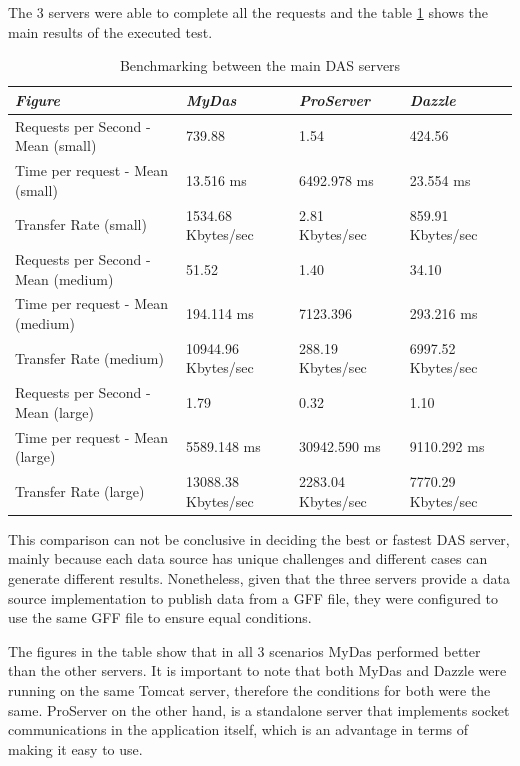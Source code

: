 The 3 servers were able to complete all the requests and the table \ref{tab:table2} shows the main results of the executed test.

\begin{table}[!ht]
	\begin{tabular}{|p{6cm}|p{3cm}|p{3cm}|p{3cm}|}
\hline 
\emph{Figure} & \emph{MyDas} & \emph{ProServer} & \emph{Dazzle}\\
\hline 
Requests per Second - Mean (small) & 739.88 & 1.54 & 424.56\\
\hline 
Time per request - Mean (small) & 13.516 ms & 6492.978 ms & 23.554 ms\\
\hline 
Transfer Rate (small) & 1534.68 Kbytes/sec & 2.81 Kbytes/sec & 859.91 Kbytes/sec\\
\hline 
Requests per Second - Mean (medium) & 51.52 & 1.40 & 34.10\\
\hline 
Time per request - Mean (medium) & 194.114 ms & 7123.396 & 293.216 ms\\
\hline 
Transfer Rate (medium) & 10944.96 Kbytes/sec & 288.19 Kbytes/sec & 6997.52 Kbytes/sec\\
\hline 
Requests per Second - Mean (large) & 1.79 & 0.32 & 1.10\\
\hline 
Time per request - Mean (large) & 5589.148 ms & 30942.590 ms & 9110.292 ms\\
\hline 
Transfer Rate (large) & 13088.38 Kbytes/sec & 2283.04 Kbytes/sec & 7770.29 Kbytes/sec\\
\hline 
	\end{tabular}
	\caption{Benchmarking between the main DAS servers}
	\label{tab:table2}
\end{table}

This comparison can not be conclusive in deciding the best or fastest DAS server, mainly because each data source has unique challenges and different cases can generate different results. Nonetheless, given that the three servers provide a data source implementation to publish data from a GFF file, they were configured to use the same GFF file to ensure equal conditions. 

The figures in the table show that in all 3 scenarios MyDas performed better than the other servers. It is important to note that both MyDas and Dazzle were running on the same Tomcat server, therefore the conditions for both were the same. ProServer on the other hand, is a standalone server that implements socket communications in the application itself, which is an advantage in terms of making it easy to use.

